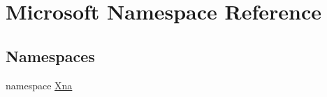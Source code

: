 \hypertarget{namespaceMicrosoft}{}\section{Microsoft Namespace Reference}
\label{namespaceMicrosoft}
\subsection*{Namespaces}
\begin{DoxyCompactItemize}
\item 
namespace \hyperlink{namespaceMicrosoft_1_1Xna}{Xna}
\end{DoxyCompactItemize}

